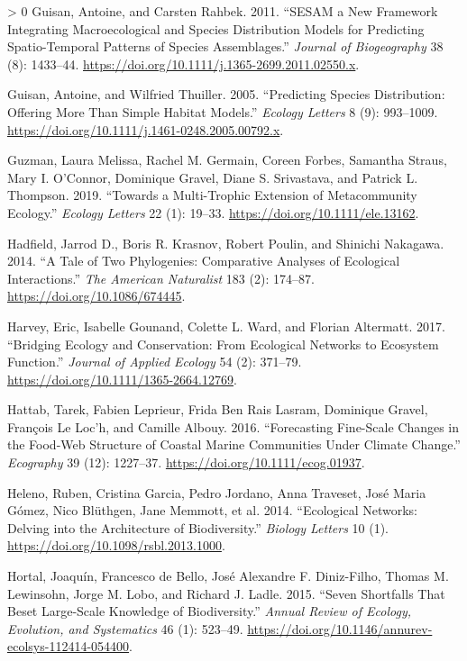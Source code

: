 \documentclass[11pt]{article}
\newlength{\cslhangindent}
\newenvironment{CSLReferences}[3] %
 {%
  \setlength{\parindent}{0pt}
  \ifodd #1 \everypar{\setlength{\hangindent}{\cslhangindent}}\ignorespaces\fi
  \ifnum #2 > 0
  \setlength{\parskip}{#2\baselineskip}
  \fi
 }%
 {}
\begin{document}
\begin{CSLReferences}{1}{0}
\leavevmode\hypertarget{ref-Guisan2011SesNew}{}%
Guisan, Antoine, and Carsten Rahbek. 2011. {``SESAM a New Framework
Integrating Macroecological and Species Distribution Models for
Predicting Spatio-Temporal Patterns of Species Assemblages.''}
\emph{Journal of Biogeography} 38 (8): 1433--44.
\url{https://doi.org/10.1111/j.1365-2699.2011.02550.x}.

\leavevmode\hypertarget{ref-Guisan2005PreSpe}{}%
Guisan, Antoine, and Wilfried Thuiller. 2005. {``Predicting Species
Distribution: Offering More Than Simple Habitat Models.''} \emph{Ecology
Letters} 8 (9): 993--1009.
\url{https://doi.org/10.1111/j.1461-0248.2005.00792.x}.

\leavevmode\hypertarget{ref-Guzman2019MulExt}{}%
Guzman, Laura Melissa, Rachel M. Germain, Coreen Forbes, Samantha
Straus, Mary I. O'Connor, Dominique Gravel, Diane S. Srivastava, and
Patrick L. Thompson. 2019. {``Towards a Multi-Trophic Extension of
Metacommunity Ecology.''} \emph{Ecology Letters} 22 (1): 19--33.
\url{https://doi.org/10.1111/ele.13162}.

\leavevmode\hypertarget{ref-Hadfield2014TalTwo}{}%
Hadfield, Jarrod D., Boris R. Krasnov, Robert Poulin, and Shinichi
Nakagawa. 2014. {``A Tale of Two Phylogenies: Comparative Analyses of
Ecological Interactions.''} \emph{The American Naturalist} 183 (2):
174--87. \url{https://doi.org/10.1086/674445}.

\leavevmode\hypertarget{ref-Harvey2017BriEco}{}%
Harvey, Eric, Isabelle Gounand, Colette L. Ward, and Florian Altermatt.
2017. {``Bridging Ecology and Conservation: From Ecological Networks to
Ecosystem Function.''} \emph{Journal of Applied Ecology} 54 (2):
371--79. \url{https://doi.org/10.1111/1365-2664.12769}.

\leavevmode\hypertarget{ref-Hattab2016ForFin}{}%
Hattab, Tarek, Fabien Leprieur, Frida Ben Rais Lasram, Dominique Gravel,
François Le Loc'h, and Camille Albouy. 2016. {``Forecasting Fine-Scale
Changes in the Food-Web Structure of Coastal Marine Communities Under
Climate Change.''} \emph{Ecography} 39 (12): 1227--37.
\url{https://doi.org/10.1111/ecog.01937}.

\leavevmode\hypertarget{ref-Heleno2014EcoNet}{}%
Heleno, Ruben, Cristina Garcia, Pedro Jordano, Anna Traveset, José Maria
Gómez, Nico Blüthgen, Jane Memmott, et al. 2014. {``Ecological Networks:
Delving into the Architecture of Biodiversity.''} \emph{Biology Letters}
10 (1). \url{https://doi.org/10.1098/rsbl.2013.1000}.

\leavevmode\hypertarget{ref-Hortal2015SevSho}{}%
Hortal, Joaquín, Francesco de Bello, José Alexandre F. Diniz-Filho,
Thomas M. Lewinsohn, Jorge M. Lobo, and Richard J. Ladle. 2015. {``Seven
Shortfalls That Beset Large-Scale Knowledge of Biodiversity.''}
\emph{Annual Review of Ecology, Evolution, and Systematics} 46 (1):
523--49. \url{https://doi.org/10.1146/annurev-ecolsys-112414-054400}.


\end{CSLReferences}
\end{document}

